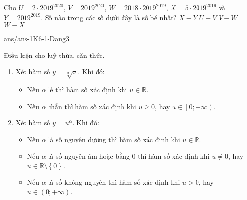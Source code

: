 \begin{ex}%
	Cho $U=2\cdot 2019^{2020}$, $V=2019^{2020}$, $W=2018 \cdot 2019^{2019}$, $X=5 \cdot 2019^{2019}$ và $Y=2019^{2019}$. Số nào trong các số dưới đây là số bé nhất?
	\choice
	{$X-Y$}
	{$U-V$}
	{\True $V-W$}
	{$W-X$}
\end{ex}
\begin{indapan}{10}
	{ans/ans-1K6-1-Dang3}
\end{indapan}

\begin{dang}{Điều kiện cho luỹ thừa, căn thức.}
	\begin{enumerate}
		\item Xét hàm số $y=\sqrt[\alpha]{u}$. Khi đó:
		\begin{itemize}
			\item Nếu $\alpha$ lẻ thì hàm số xác định khi $u\in \mathbb{R}$.
			\item Nếu $\alpha$ chẵn thì hàm số xác định khi $u\geq 0$, hay $u\in \left[0; +\infty\right)$.
		\end{itemize}	
		\item Xét hàm số $y=u^\alpha$. Khi đó:
		\begin{itemize}
			\item Nếu $\alpha$ là số nguyên dương thì hàm số xác định khi $u\in \mathbb{R}$.
			\item Nếu $\alpha$ là số nguyên âm hoặc bằng 0 thì hàm số xác định khi $u\neq 0$, hay $u\in \mathbb{R}\setminus \left\{0\right\}$.
			\item Nếu $\alpha$ là số không nguyên thì hàm số xác định khi $u> 0$, hay $u\in\left(0; +\infty\right)$.
		\end{itemize}
	\end{enumerate}
\end{dang}
